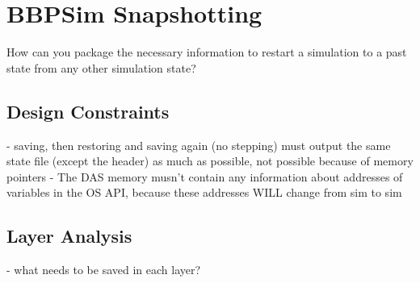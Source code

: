{
\setlength{\parindent}{2em}
\chapter{BBPSim Snapshotting}\label{cha:bbpsim-impl}
How can you package the necessary information to restart a simulation to a past state from any other simulation state? 

\section{Design Constraints}
- saving, then restoring and saving again (no stepping) must output the same state file (except the header) as much as possible, not possible because of memory pointers
- The DAS memory musn't contain any information about addresses of variables in the OS API, because these addresses WILL change from sim to sim

\section{Layer Analysis}
- what needs to be saved in each layer?

}
